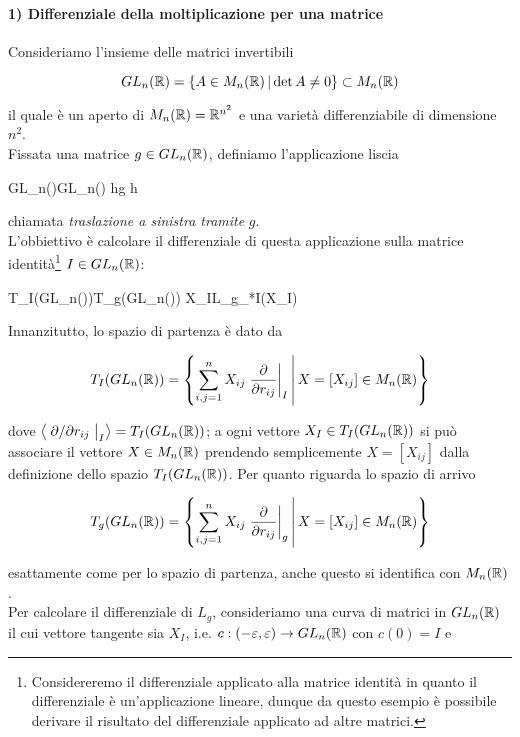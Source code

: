 \paragraph{1) Differenziale della moltiplicazione per una matrice}\label{example:trasl-diff}

Consideriamo l'insieme delle matrici invertibili

\begin{equation}
	GL_{n}(\mathbb{R}) = \left\{ A \in M_{n}(\mathbb{R}) \, \middle| \, \det A \neq 0 \right\} \subset M_{n}(\mathbb{R})
\end{equation}

il quale è un aperto di $ M_{n}(\mathbb{R}) = \mathbb{R}^{n^{2}} $ e una varietà differenziabile di dimensione $ n^{2} $. \\
Fissata una matrice $ g \in GL_{n}(\mathbb{R}) $, definiamo l'applicazione liscia

	{GL_{n}(\R)}{GL_{n}(\R)}
	{h}{g h}

chiamata \textit{traslazione a sinistra tramite} $ g $. \\
L'obbiettivo è calcolare il differenziale di questa applicazione sulla matrice identità\footnote{%
	Considereremo il differenziale applicato alla matrice identità in quanto il differenziale è un'applicazione lineare, dunque da questo esempio è possibile derivare il risultato del differenziale applicato ad altre matrici.%
} $ I \in GL_{n}(\mathbb{R}) $:

	{T_{I}(GL_{n}(\R))}{T_{g}(GL_{n}(\R))}
	{X_{I}}{L_{g_{*I}}(X_{I})}

Innanzitutto, lo spazio di partenza è dato da

\begin{equation}
	T_{I}(GL_{n}(\R)) = \left\{ \sum_{i,j=1}^{n} X_{ij} \eval{ \pdv{r_{ij}} }_{I} \st X=[X_{ij}] \in M_{n}(\R) \right\}
\end{equation}

dove $ \ev{ \eval{ \pdv*{r_{ij}} }_{I} } = T_{I}(GL_{n}(\R)) $; a ogni vettore $ X_{I} \in T_{I}(GL_{n}(\mathbb{R})) $ si può associare il vettore $ X \in M_{n}(\mathbb{R}) $ prendendo semplicemente $ X=[X_{ij}] $ dalla definizione dello spazio $ T_{I}(GL_{n}(\mathbb{R})) $. Per quanto riguarda lo spazio di arrivo

\begin{equation}
	T_{g}(GL_{n}(\R)) = \left\{ \sum_{i,j=1}^{n} X_{ij} \eval{ \pdv{r_{ij}} }_{g} \st X=[X_{ij}] \in M_{n}(\R) \right\}
\end{equation}

esattamente come per lo spazio di partenza, anche questo si identifica con $ M_{n}(\mathbb{R}) $. \\
Per calcolare il differenziale di $ L_{g} $, consideriamo una curva di matrici in $ GL_{n}(\mathbb{R}) $ il cui vettore tangente sia $ X_{I} $, i.e. $ c : (-\varepsilon,\varepsilon) \to GL_{n}(\mathbb{R}) $ con $ c(0)=I $ e 

